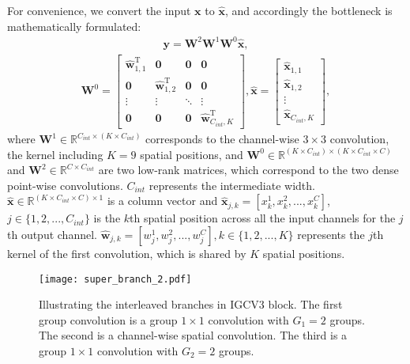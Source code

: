 \documentclass{bmvc2k}
\begin{document}
	For convenience, we convert the input $\mathbf{x}$ to $\mathbf{\hat{x}}$, and accordingly the bottleneck is mathematically formulated:
	\begin{align}
	\mathbf{y} = \mathbf{W}^2\mathbf{W}^1\mathbf{W}^0 \mathbf{\hat{x}},
	\label{eqn:mnv2}
	\end{align}
	\begin{align}
	\mathbf{W}^0 =  \begin{bmatrix}
	\mathbf{\hat{w}}_{1,1}^\mathrm{T} & \boldsymbol{0} &  \boldsymbol{0} &  \boldsymbol{0}
	\\[0.3em]
	\boldsymbol{0} & \mathbf{\hat{w}}_{1,2}^\mathrm{T}  & \boldsymbol{0} & \boldsymbol{0} \\[0.3em]
	\vdots & \vdots & \ddots  & \vdots \\[0.3em]
	\boldsymbol{0} & \boldsymbol{0} & \boldsymbol{0} & \mathbf{\hat{w}}_{C_{int},K}^\mathrm{T}
	\end{bmatrix},
	\mathbf{\hat{x}} =  \begin{bmatrix}
	\mathbf{\hat{x}}_{1,1}\\[0.3em]
	\mathbf{\hat{x}}_{1,2}  \\[0.3em]
	\vdots \\[0.3em]
	\mathbf{\hat{x}}_{C_{int},K}
	\end{bmatrix},
	\label{eqn:mmnv2}
	\end{align}
	where $\mathbf{W}^1 \in \mathbb{R}^{C_{int}\times (K\times C_{int})}$ corresponds to the channel-wise $3 \times 3$ convolution, the kernel including $K=9$ spatial positions, and $\mathbf{W}^0 \in \mathbb{R}^{(K\times C_{int})\times (K\times C_{int}\times C)}$ and $\mathbf{W}^2 \in \mathbb{R}^{C\times C_{int}}$ are two low-rank matrices, which correspond to the two dense point-wise convolutions. $C_{int}$ represents the intermediate width. $\mathbf{\hat{x}}\in \mathbb{R}^{(K\times C_{int} \times C)\times 1}$ is a column vector and $\mathbf{\hat{x}}_{j,k} = [x^1_k,x^2_k,...,x^{C}_k]$, $j \in \{1,2,...,C_{int}\}$ is the $k$th spatial position across all the input channels for the $j$th output channel. $\mathbf{\hat{w}}_{j,k}=[w_j^1,w_j^2,...,w_j^{C}], k\in\{1,2,...,K\}$ represents the $j$th kernel of the first convolution, which is shared by $K$ spatial positions.

	\begin{figure}[t]
		\centering
		\texttt{[image: super\_branch\_2.pdf]}
		\caption{Illustrating the interleaved branches in IGCV$3$ block. The first group convolution is a group $1\times1$ convolution with $G_1=2$ groups. The second is a channel-wise spatial convolution. The third is a group $1\times1$ convolution with $G_2=2$ groups.}
		\label{fig:igc-v3-path}
	\end{figure}
\end{document}
